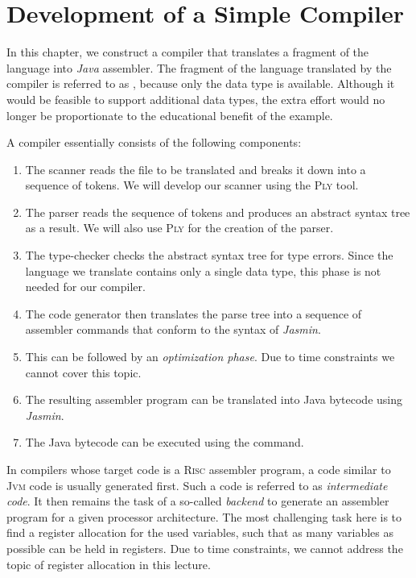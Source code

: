 \chapter{Development of a Simple Compiler}
In this chapter, we construct a compiler that translates a fragment of the  language into \textsl{Java} assembler. The fragment of the  language translated by the compiler is referred to as ,  because only the data type  is available. Although it would be feasible to support additional data types, the extra effort would no longer be proportionate to the educational benefit of the example.

A compiler essentially consists of the following components:
\begin{enumerate}
\item The scanner reads the file to be translated and breaks it down into a sequence of tokens. We will develop our scanner using the \textsc{Ply} tool.
\item The parser reads the sequence of tokens and produces an abstract syntax tree as a result. We will also use \textsc{Ply} for the creation of the parser.
\item The type-checker checks the abstract syntax tree for type errors. Since the language we translate
  contains only a single data type, this phase is not needed for our compiler.
\item The code generator then translates the parse tree into a sequence of assembler commands that conform to the syntax of \textsl{Jasmin}.
\item This can be followed by an \emph{optimization phase}.   Due to time constraints we cannot cover this topic.
\item The resulting assembler program can be translated into Java bytecode using \textsl{Jasmin}.
\item The Java bytecode can be executed using the  command.
\end{enumerate}
In compilers whose target code is a \textsc{Risc} assembler program, a code similar to \textsc{Jvm} code is
usually generated first. Such a code is referred to as \emph{intermediate code}. It then remains the task of a
so-called \emph{backend} to generate an assembler program for a given processor architecture. The most
challenging task here is to find a register allocation for the used variables, such that as many variables as
possible can be held in registers. Due to time constraints, we cannot address the topic of register allocation
in this lecture.

